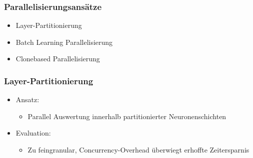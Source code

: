 \documentclass[18pt]{beamer}
\begin{document}
	\begin{frame}[c]\frametitle{Parallelisierungsansätze}
		\begin{itemize}
			\item Layer-Partitionierung
			\item Batch Learning Parallelisierung
			\item Clonebased Parallelisierung
		\end{itemize}	
	\end{frame}
	
	\begin{frame}[c]\frametitle{Layer-Partitionierung}
		\begin{itemize}
			\item Ansatz:
			 \begin{itemize}
				\item Parallel Auswertung innerhalb partitionierter Neuronenschichten
			\end{itemize}
			\item Evaluation:
			\begin{itemize}
				\item Zu feingranular, Concurrency-Overhead überwiegt erhoffte Zeitersparnis
			\end{itemize}
		\end{itemize}	
	\end{frame}
\end{document}
